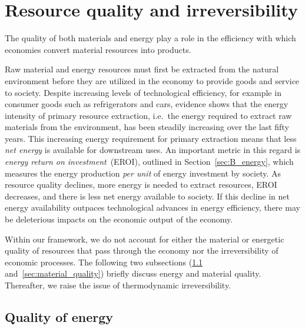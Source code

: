 \section{Resource quality and irreversibility}
\label{sec:resource_quality_and_irreversibility}

The quality of both materials
and energy play a role in the 
efficiency with which economies 
convert material resources into products.

Raw material and energy resources must first 
be extracted from the natural environment 
before they are utilized in the economy 
to provide goods and service to society. 
Despite increasing levels of technological efficiency, 
for example in consumer goods such as refrigerators and cars, 
evidence shows that 
the energy intensity of primary resource extraction, 
i.e.\ the energy required to extract raw materials 
from the environment, 
has been steadily increasing over 
the last fifty years.\cite{Hall1986, Mudd2010, Brandt2011} 
This increasing energy requirement for 
primary extraction means that 
less \textit{net energy} is available 
for downstream uses. 
An important metric in this regard is
\emph{energy return on investment}~(EROI),
outlined in Section~\ref{sec:B_energy},
which measures the energy production
\emph{per unit} of energy investment by society.
As resource quality declines,
more energy is needed to extract resources,
EROI decreases,
and there is less net energy available to society.
If this decline in net energy availability 
outpaces technological advances in energy efficiency, 
there may be deleterious impacts on the 
economic output of the economy.

Within our framework, we do not account for either
the material or energetic quality of resources 
that pass through the economy nor the 
irreversibility of economic processes.
The following two subsections (\ref{sec:energy_quality}
and~\ref{sec:material_quality}) briefly discuss energy and material quality.
Thereafter, we raise the issue of thermodynamic irreversibility.



\subsection{Quality of energy}
\label{sec:energy_quality}

